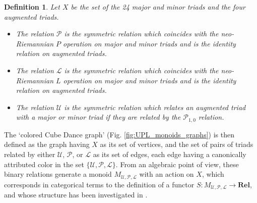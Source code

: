 \documentclass[10pt]{amsart}
\newtheorem{definition}{Definition}
\begin{document}
\begin{definition}
Let $X$ be the set of the 24 major and minor triads and the four augmented triads.
\begin{itemize}
\item{The relation $\mathcal{P}$ is the symmetric relation which coincides with the neo-Riemannian $P$ operation on major and minor triads and is the identity relation on augmented triads.}
\item{The relation $\mathcal{L}$ is the symmetric relation which coincides with the neo-Riemannian $L$ operation on major and minor triads and is the identity relation on augmented triads.}
\item{The relation $\mathcal{U}$ is the symmetric relation which relates an augmented triad with a major or minor triad if they are related by the $\mathcal{P}_{1,0}$ relation.}
\end{itemize}
\end{definition}

The `colored Cube Dance graph' (Fig. \ref{fig:UPL_monoids_graphs}) is then defined as the graph having $X$ as its set of vertices, and the set of pairs of triads related by either $\mathcal{U}$, $\mathcal{P}$, or $\mathcal{L}$ as its set of edges, each edge having a canonically attributed color in the set $\{ \mathcal{U}, \mathcal{P}, \mathcal{L} \}$. From an algebraic point of view, these binary relations generate a monoid $M_{\mathcal{U},\mathcal{P}, \mathcal{L}}$ with an action on $X$, which corresponds in categorical terms to the definition of a functor $S \colon M_{\mathcal{U},\mathcal{P}, \mathcal{L}} \to \mathbf{Rel}$, and whose structure has been investigated in \cite{Popoff2018}.
\end{document}
